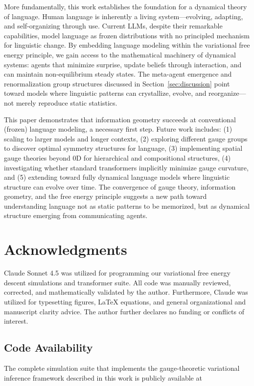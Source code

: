 \documentclass[twoside,11pt]{article}
\begin{document}
More fundamentally, this work establishes the foundation for a dynamical theory of language. Human language is inherently a living system---evolving, adapting, and self-organizing through use. Current LLMs, despite their remarkable capabilities, model language as frozen distributions with no principled mechanism for linguistic change. By embedding language modeling within the variational free energy principle, we gain access to the mathematical machinery of dynamical systems: agents that minimize surprise, update beliefs through interaction, and can maintain non-equilibrium steady states. The meta-agent emergence and renormalization group structures discussed in Section~\ref{sec:discussion} point toward models where linguistic patterns can crystallize, evolve, and reorganize---not merely reproduce static statistics.

This paper demonstrates that information geometry succeeds at conventional (frozen) language modeling, a necessary first step. Future work includes: (1) scaling to larger models and longer contexts, (2) exploring different gauge groups to discover optimal symmetry structures for language, (3) implementing spatial gauge theories beyond 0D for hierarchical and compositional structures, (4) investigating whether standard transformers implicitly minimize gauge curvature, and (5) extending toward fully dynamical language models where linguistic structure can evolve over time. The convergence of gauge theory, information geometry, and the free energy principle suggests a new path toward understanding language not as static patterns to be memorized, but as dynamical structure emerging from communicating agents.

\section*{Acknowledgments}
Claude Sonnet 4.5 was utilized for programming our variational free energy descent simulations and transformer suite.  All code was manually reviewed, corrected, and mathematically validated by the author.  Furthermore, Claude was utilized for typesetting figures, LaTeX equations, and general organizational and manuscript clarity advice. The author further declares no funding or conflicts of interest.

\subsection{Code Availability}
The complete simulation suite that implements the gauge-theoretic variational inference framework described in this work is publicly available at 
\end{document}
